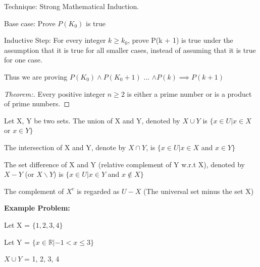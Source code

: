 \documentclass[12pt]{article}
\begin{document}
\newpage


Technique: Strong Mathematical Induction.


Base case: Prove $P(K_{0})$ is true

Inductive Step: For every integer $k \geq k_0$, prove P(k + 1) is true under the assumption that it is true for all smaller cases, instead of assuming that it is true for one case. 

Thus we are proving $P(K_0) \land P(K_0 + 1)$ ... $\land P(k) \implies P(k + 1)$

\begin{proof}[Theorem:] 
    Every positive integer $n \geq 2$ is either a prime number or is a product of prime numbers.
\end{proof}

\newpage

Let X, Y be two sets. The union of X and Y, denoted by $X \cup Y$ is $\{ x \in U | x \in X $ or $ x \in Y \}$

The intersection of X and Y, denote by $X \cap Y$, is $\{ x \in U | x \in X $ and $ x \in Y \}$

The set difference of X and Y (relative complement of Y w.r.t X), denoted by $X - Y$ (or $X \backslash Y$) is $\{ x \in U | x \in Y $ and $ x \notin X \}$

\medbreak


\medbreak

The complement of $X^c$ is regarded as $U - X$ (The universal set minus the set X)

\medbreak

\textbf{Example Problem: }

Let X = $\{1, 2, 3, 4\}$

Let Y = $\{ x \in \mathbb{R} | -1 < x \leq 3 \}$

$X \cup Y$  = 1, 2, 3, 4
\end{document}
